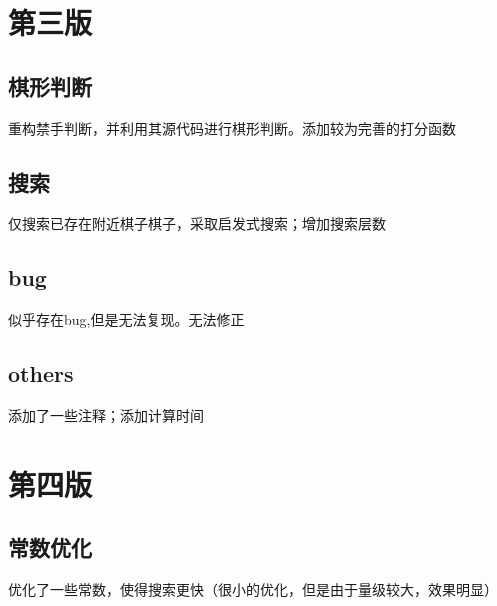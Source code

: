\documentclass[a4paper,12pt]{ctexart}
\begin{document}
\section{第三版}

\subsection{棋形判断}
重构禁手判断，并利用其源代码进行棋形判断。添加较为完善的打分函数

\subsection{搜索}
仅搜索已存在附近棋子棋子，采取启发式搜索；增加搜索层数

\subsection{bug}
似乎存在bug,但是无法复现。无法修正

\subsection{others}
添加了一些注释；添加计算时间

\section{第四版}

\subsection{常数优化}
优化了一些常数，使得搜索更快（很小的优化，但是由于量级较大，效果明显）
\end{document}
